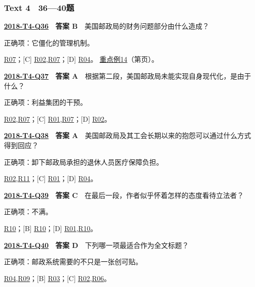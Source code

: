 \documentclass[11pt,a4paper]{article}
\begin{document}
\subsubsection{Text 4　36—40题}
\label{idx-2018-T4-Q36}
\noindent\textbf{\href{https://zj139.github.io/math-notes/english/1dafc7c55c9104451a24cdf8/\#q36}{2018-T4-Q36}　答案 B}　美国邮政局的财务问题部分由什么造成？\par\nopagebreak
\noindent 正确项：它僵化的管理机制。\par\nopagebreak
\noindent [A] \hyperref[cat-R07]{R07}；[C] \hyperref[cat-R02]{R02},\hyperref[cat-R07]{R07}；[D] \hyperref[cat-R04]{R04}。
\hyperref[case-2018-T4-Q36]{重点例14}（第\pageref{case-2018-T4-Q36}页）。
\par\smallskip
{}\label{idx-2018-T4-Q37}
\noindent\textbf{\href{https://zj139.github.io/math-notes/english/1dafc7c55c9104451a24cdf8/\#q37}{2018-T4-Q37}　答案 A}　根据第二段，美国邮政局未能实现自身现代化，是由于什么？\par\nopagebreak
\noindent 正确项：利益集团的干预。\par\nopagebreak
\noindent [B] \hyperref[cat-R02]{R02},\hyperref[cat-R07]{R07}；[C] \hyperref[cat-R01]{R01},\hyperref[cat-R07]{R07}；[D] \hyperref[cat-R02]{R02}。
\par\smallskip
{}\label{idx-2018-T4-Q38}
\noindent\textbf{\href{https://zj139.github.io/math-notes/english/1dafc7c55c9104451a24cdf8/\#q38}{2018-T4-Q38}　答案 A}　美国邮政局及其工会长期以来的抱怨可以通过什么方式得到回应？\par\nopagebreak
\noindent 正确项：卸下邮政局承担的退休人员医疗保障负担。\par\nopagebreak
\noindent [B] \hyperref[cat-R02]{R02},\hyperref[cat-R11]{R11}；[C] \hyperref[cat-R01]{R01}；[D] \hyperref[cat-R04]{R04}。
\par\smallskip
{}\label{idx-2018-T4-Q39}
\noindent\textbf{\href{https://zj139.github.io/math-notes/english/1dafc7c55c9104451a24cdf8/\#q39}{2018-T4-Q39}　答案 C}　在最后一段，作者似乎怀着怎样的态度看待立法者？\par\nopagebreak
\noindent 正确项：不满。\par\nopagebreak
\noindent [A] \hyperref[cat-R10]{R10}；[B] \hyperref[cat-R10]{R10}；[D] \hyperref[cat-R01]{R01},\hyperref[cat-R10]{R10}。
\par\smallskip
{}\label{idx-2018-T4-Q40}
\noindent\textbf{\href{https://zj139.github.io/math-notes/english/1dafc7c55c9104451a24cdf8/\#q40}{2018-T4-Q40}　答案 D}　下列哪一项最适合作为全文标题？\par\nopagebreak
\noindent 正确项：邮政系统需要的不只是一张创可贴。\par\nopagebreak
\noindent [A] \hyperref[cat-R04]{R04},\hyperref[cat-R09]{R09}；[B] \hyperref[cat-R03]{R03}；[C] \hyperref[cat-R02]{R02},\hyperref[cat-R06]{R06}。
\par\smallskip
\clearpage\setlength{\parskip}{1pt}
\end{document}
